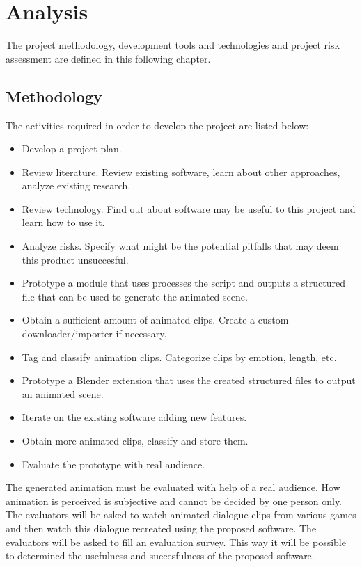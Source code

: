 \chapter{Analysis \label{chap:analysis}}

\noindent The project  methodology,  development  tools  and  technologies  and  project  risk assessment are defined in this following chapter.


\section{Methodology}

The activities required in order to develop the project are listed below:

\begin{itemize}
\item Develop a project plan.
\item Review literature. Review existing software, learn about other approaches, analyze existing research.
\item Review technology. Find out about software may be useful to this project and learn how to use it.
\item Analyze risks. Specify what might be the potential pitfalls that may deem this product unsuccesful.
\item Prototype a module that uses processes the script and outputs a structured file that can be used to generate the animated scene.
\item Obtain a sufficient amount of animated clips. Create a custom downloader/importer if necessary.
\item Tag and classify animation clips. Categorize clips by emotion, length, etc.
\item Prototype a Blender extension that uses the created structured files to output an animated scene.
\item Iterate on the existing software adding new features.
\item Obtain more animated clips, classify and store them.
\item Evaluate the prototype with real audience.
\end{itemize}

The generated animation must be evaluated with help of a real audience. How animation is perceived is subjective and cannot be decided by one person only. The evaluators will be asked to watch animated dialogue clips from various games and then watch this dialogue recreated using the proposed software. The evaluators will be asked to fill an evaluation survey. This way it will be possible to determined the usefulness and succesfulness of the proposed software.


